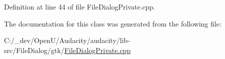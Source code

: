 Definition at line 44 of file File\+Dialog\+Private.\+cpp.



The documentation for this class was generated from the following file\+:\begin{DoxyCompactItemize}
\item 
C\+:/\+\_\+dev/\+Open\+U/\+Audacity/audacity/lib-\/src/\+File\+Dialog/gtk/\hyperlink{gtk_2_file_dialog_private_8cpp}{File\+Dialog\+Private.\+cpp}\end{DoxyCompactItemize}
